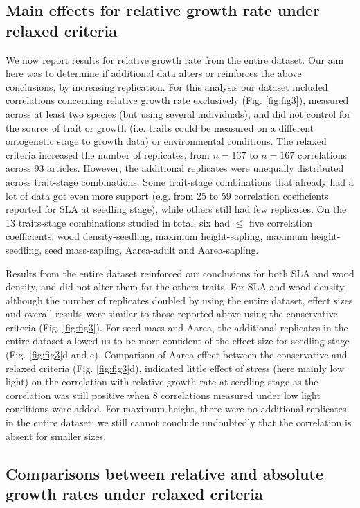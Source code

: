 \documentclass[a4paper,11pt]{article}
\begin{document}
\subsection*{Main effects for relative growth rate under relaxed criteria}

We now report results for relative growth rate from the entire dataset. Our aim here was to determine if additional data alters or reinforces the above conclusions, by increasing replication. For this analysis our dataset included correlations concerning relative growth rate exclusively (Fig. \ref{fig:fig3}), measured across at least two species (but using several individuals), and did not control for the source of trait or growth (i.e. traits could be measured on a different ontogenetic stage to growth data) or environmental conditions. The relaxed criteria increased the number of replicates, from $n = 137$ to $n = 167$ correlations across 93 articles. However, the additional replicates were unequally distributed across trait-stage combinations. Some trait-stage combinations that already had a lot of data got even more support (e.g. from 25 to 59 correlation coefficients reported for SLA at seedling stage), while others still had few replicates. On the 13 traits-stage combinations studied in total, six had $\le$ five correlation coefficients: wood density-seedling, maximum height-sapling, maximum height-seedling, seed mass-sapling, Aarea-adult and Aarea-sapling.

Results from the entire dataset reinforced our conclusions for both SLA and wood density, and did not alter them for the others traits. For SLA and wood density, although the number of replicates doubled by using the entire dataset, effect sizes and overall results were similar to those reported above using the conservative criteria (Fig. \ref{fig:fig3}). For seed mass and Aarea, the additional replicates in the entire dataset allowed us to be more confident of the effect size for seedling stage (Fig. \ref{fig:fig3}d and e). Comparison of Aarea effect between the conservative and relaxed criteria (Fig. \ref{fig:fig3}d), indicated little effect of stress (here mainly low light) on the correlation with relative growth rate at seedling stage as the correlation was still positive when 8 correlations measured under low light conditions were added. For maximum height, there were no additional replicates in the entire dataset; we still cannot conclude undoubtedly that the correlation is absent for smaller sizes.

\subsection*{Comparisons between relative and absolute growth rates under relaxed criteria}
\end{document}
